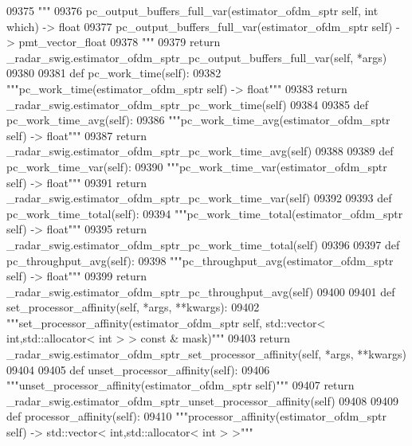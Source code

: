 \begin{DoxyCode}
{{{{{{{{{{{{{{{{{{{{{{{{{{{{{{09375         \textcolor{stringliteral}{"""}
09376 \textcolor{stringliteral}{        pc\_output\_buffers\_full\_var(estimator\_ofdm\_sptr self, int which) -> float}
09377 \textcolor{stringliteral}{        pc\_output\_buffers\_full\_var(estimator\_ofdm\_sptr self) -> pmt\_vector\_float}
09378 \textcolor{stringliteral}{        """}
09379         \textcolor{keywordflow}{return} \_radar\_swig.estimator\_ofdm\_sptr\_pc\_output\_buffers\_full\_var(self, *args)
09380 
09381     \textcolor{keyword}{def }pc_work_time(self):
09382         \textcolor{stringliteral}{"""pc\_work\_time(estimator\_ofdm\_sptr self) -> float"""}
09383         \textcolor{keywordflow}{return} \_radar\_swig.estimator\_ofdm\_sptr\_pc\_work\_time(self)
09384 
09385     \textcolor{keyword}{def }pc_work_time_avg(self):
09386         \textcolor{stringliteral}{"""pc\_work\_time\_avg(estimator\_ofdm\_sptr self) -> float"""}
09387         \textcolor{keywordflow}{return} \_radar\_swig.estimator\_ofdm\_sptr\_pc\_work\_time\_avg(self)
09388 
09389     \textcolor{keyword}{def }pc_work_time_var(self):
09390         \textcolor{stringliteral}{"""pc\_work\_time\_var(estimator\_ofdm\_sptr self) -> float"""}
09391         \textcolor{keywordflow}{return} \_radar\_swig.estimator\_ofdm\_sptr\_pc\_work\_time\_var(self)
09392 
09393     \textcolor{keyword}{def }pc_work_time_total(self):
09394         \textcolor{stringliteral}{"""pc\_work\_time\_total(estimator\_ofdm\_sptr self) -> float"""}
09395         \textcolor{keywordflow}{return} \_radar\_swig.estimator\_ofdm\_sptr\_pc\_work\_time\_total(self)
09396 
09397     \textcolor{keyword}{def }pc_throughput_avg(self):
09398         \textcolor{stringliteral}{"""pc\_throughput\_avg(estimator\_ofdm\_sptr self) -> float"""}
09399         \textcolor{keywordflow}{return} \_radar\_swig.estimator\_ofdm\_sptr\_pc\_throughput\_avg(self)
09400 
09401     \textcolor{keyword}{def }set_processor_affinity(self, *args, **kwargs):
09402         \textcolor{stringliteral}{"""set\_processor\_affinity(estimator\_ofdm\_sptr self, std::vector< int,std::allocator< int > > const
       & mask)"""}
09403         \textcolor{keywordflow}{return} \_radar\_swig.estimator\_ofdm\_sptr\_set\_processor\_affinity(self, *args, **kwargs)
09404 
09405     \textcolor{keyword}{def }unset_processor_affinity(self):
09406         \textcolor{stringliteral}{"""unset\_processor\_affinity(estimator\_ofdm\_sptr self)"""}
09407         \textcolor{keywordflow}{return} \_radar\_swig.estimator\_ofdm\_sptr\_unset\_processor\_affinity(self)
09408 
09409     \textcolor{keyword}{def }processor_affinity(self):
09410         \textcolor{stringliteral}{"""processor\_affinity(estimator\_ofdm\_sptr self) -> std::vector< int,std::allocator< int > >"""}
}}}}}}}}}}}}}}}}}}}}}}}}}}}}}}
\end{DoxyCode}
